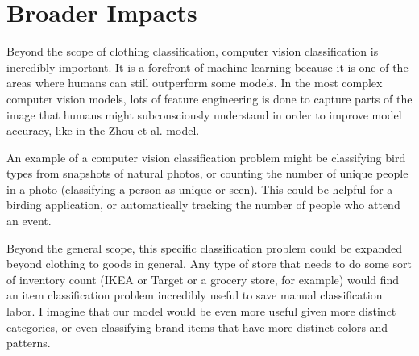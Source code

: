 
\section{Broader Impacts}
\label{sec:impacts}

Beyond the scope of clothing classification, computer vision classification is incredibly important. It is a forefront of machine learning because it is one of the areas where humans can still outperform some models. In the most complex computer vision models, lots of feature engineering is done to capture parts of the image that humans might subconsciously understand in order to improve model accuracy, like in the Zhou et al. model.

An example of a computer vision classification problem might be classifying bird types from snapshots of natural photos, or counting the number of unique people in a photo (classifying a person as unique or seen). This could be helpful for a birding application, or automatically tracking the number of people who attend an event.

Beyond the general scope, this specific classification problem could be expanded beyond clothing to goods in general. Any type of store that needs to do some sort of inventory count (IKEA or Target or a grocery store, for example) would find an item classification problem incredibly useful to save manual classification labor. I imagine that our model would be even more useful given more distinct categories, or even classifying brand items that have more distinct colors and patterns.